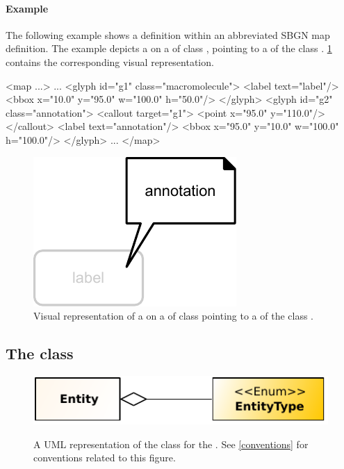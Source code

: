 \paragraph{Example}

The following example shows a \Callout definition within an abbreviated SBGN map definition. The example depicts a \Callout on a \Glyph of class , pointing to a \Glyph of the class . \ref{fig:callout_example} contains the corresponding visual representation.

\begin{example}
<map ...>
    ...
    <glyph id="g1" class="macromolecule">
        <label text="label"/>
        <bbox x="10.0" y="95.0" w="100.0" h="50.0"/>
    </glyph>
    <glyph id="g2" class="annotation">
        <callout target="g1">
            <point x="95.0" y="110.0"/>
        </callout>
        <label text="annotation"/>
        <bbox x="95.0" y="10.0" w="100.0" h="100.0"/>
    </glyph>
    ...
</map>
\end{example}

\begin{figure}[!ht]
  \centering
  \includegraphics[scale=0.9]{figures/callout_example.pdf}
\caption{Visual representation of a \Callout on a \Glyph of class  pointing to a \Glyph of the class .}
  \label{fig:callout_example}
\end{figure}


\subsection{The  class}
\label{entity-class}

\begin{figure}[ht!]
  \centering
  \includegraphics[scale=1.0]{figures/sbgnml_entity_uml.pdf}\\
\caption{A UML representation of the \Entity class for the
\SbgnmlPackage. See \ref{conventions} for conventions related to this
figure. }
  \label{fig:sbgnml_entity_uml}
\end{figure}


